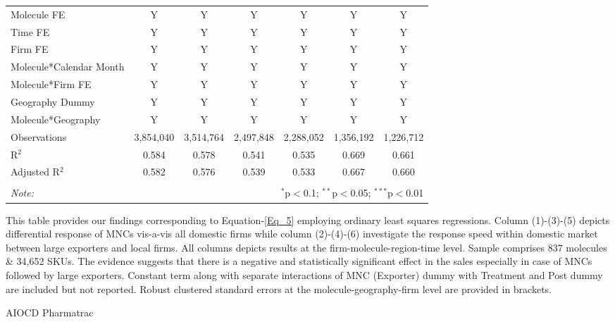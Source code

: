\documentclass[AER]{AEA}
\theoremstyle{theorem}
\begin{document}
\begin{table}[h!]
\begin{tabular}{@{\extracolsep{1pt}}lcccccc}
	Molecule FE & Y & Y & Y & Y & Y & Y \\ 
	Time FE & Y & Y & Y & Y & Y & Y \\ 
	Firm FE & Y & Y & Y & Y & Y & Y \\ 
	Molecule*Calendar Month & Y & Y & Y & Y & Y & Y \\ 
	Molecule*Firm FE & Y & Y & Y & Y & Y & Y \\ 
	Geography Dummy & Y & Y & Y & Y & Y & Y \\ 
	Molecule*Geography & Y & Y & Y & Y & Y & Y \\ 
	Observations & 3,854,040 & 3,514,764 & 2,497,848 & 2,288,052 & 1,356,192 & 1,226,712 \\ 
	R$^{2}$ & 0.584 & 0.578 & 0.541 & 0.535 & 0.669 & 0.661 \\ 
	Adjusted R$^{2}$ & 0.582 & 0.576 & 0.539 & 0.533 & 0.667 & 0.660 \\ 
		\hline 
		\hline \\[-1.8ex] 
		\textit{Note:}  & \multicolumn{6}{r}{$^{*}$p$<$0.1; $^{**}$p$<$0.05; $^{***}$p$<$0.01} \\ 
	\end{tabular} 
	\begin{tablenotes}
		This table provides our findings corresponding to Equation-\ref{Eq_5}  employing ordinary least squares regressions. Column (1)-(3)-(5) depicts differential response of MNCs vis-a-vis all domestic firms while column (2)-(4)-(6) investigate the response speed within domestic market between large exporters and local firms. All columns depicts results at the firm-molecule-region-time level. Sample comprises 837 molecules \& 34,652 SKUs. The evidence suggests that there is a negative and statistically significant effect in the sales especially in case of MNCs followed by large exporters. Constant term along with separate interactions of MNC (Exporter) dummy with Treatment and Post dummy are included but not reported. Robust clustered standard errors at the molecule-geography-firm level are provided in brackets.
	\end{tablenotes}
	\begin{tablenotes}[Source]
		AIOCD Pharmatrac
	\end{tablenotes}
\end{table} 
\end{document}
